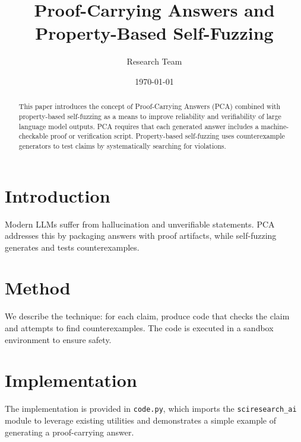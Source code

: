 \documentclass{article}
\title{Proof-Carrying Answers and Property-Based Self-Fuzzing}
\author{Research Team}
\date{\today}
\begin{document}
\maketitle

\begin{abstract}
This paper introduces the concept of Proof-Carrying Answers (PCA) combined with property-based self-fuzzing as a means to improve reliability and verifiability of large language model outputs. PCA requires that each generated answer includes a machine-checkable proof or verification script. Property-based self-fuzzing uses counterexample generators to test claims by systematically searching for violations.
\end{abstract}

\section{Introduction}
Modern LLMs suffer from hallucination and unverifiable statements. PCA addresses this by packaging answers with proof artifacts, while self-fuzzing generates and tests counterexamples.

\section{Method}
We describe the technique: for each claim, produce code that checks the claim and attempts to find counterexamples. The code is executed in a sandbox environment to ensure safety.

\section{Implementation}
The implementation is provided in \texttt{code.py}, which imports the \texttt{sciresearch\_ai} module to leverage existing utilities and demonstrates a simple example of generating a proof-carrying answer.
\end{document}
